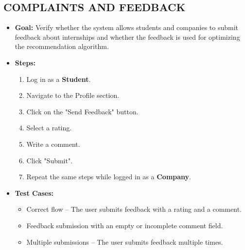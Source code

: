 \subsection{COMPLAINTS AND FEEDBACK}\label{subsec:complaints-and-feedback}
\begin{itemize}
    \item \textbf{Goal:} Verify whether the system allows students and companies to submit feedback about internships and whether the feedback is used for optimizing the recommendation algorithm.

    \item \textbf{Steps:}
    \begin{enumerate}
        \item Log in as a \textbf{Student}.
        \item Navigate to the Profile section.
        \item Click on the "Send Feedback" button.
        \item Select a rating.
        \item Write a comment.
        \item Click "Submit".
        \item Repeat the same steps while logged in as a \textbf{Company}.
    \end{enumerate}

    \item \textbf{Test Cases:}
    \begin{itemize}
        \item Correct flow – The user submits feedback with a rating and a comment.
        \item Feedback submission with an empty or incomplete comment field.
        \item Multiple submissions – The user submits feedback multiple times.
    \end{itemize}


\end{itemize}
